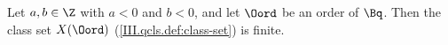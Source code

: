 Let $a,b\in\Z$ with $a<0$ and $b<0$, and let $\Oord$ be an order of $\Bq$. Then the class set $X(\Oord)$
(\cref{III.qcls.def:class-set}) is finite.
